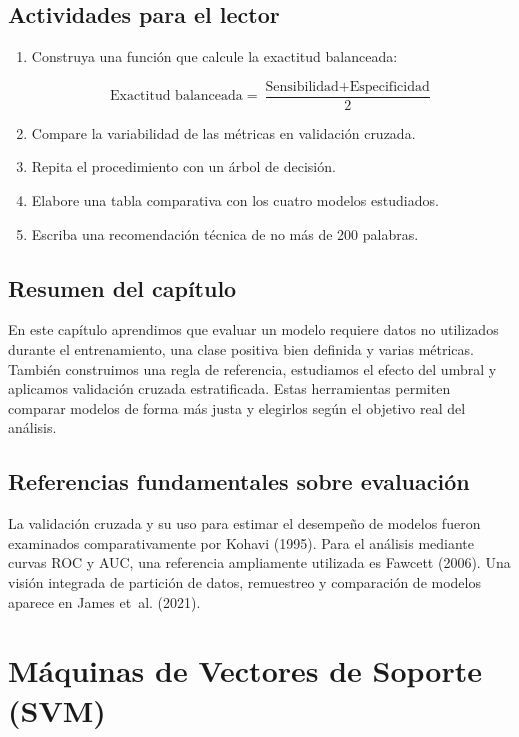 \documentclass[
  spanish,
  10.5pt,
  letterpaper,
  openany,
  headings=big]{scrbook}
\begin{document}
\section{Actividades para el lector}\label{actividades-para-el-lector-1}

\begin{enumerate}
\def\labelenumi{\arabic{enumi}.}
\item
  Construya una función que calcule la exactitud balanceada:

  \[
  \text{Exactitud balanceada}=\frac{\text{Sensibilidad}+\text{Especificidad}}{2}
  \]
\item
  Compare la variabilidad de las métricas en validación cruzada.
\item
  Repita el procedimiento con un árbol de decisión.
\item
  Elabore una tabla comparativa con los cuatro modelos estudiados.
\item
  Escriba una recomendación técnica de no más de 200 palabras.
\end{enumerate}

\section{Resumen del capítulo}\label{resumen-del-capuxedtulo-1}

En este capítulo aprendimos que evaluar un modelo requiere datos no
utilizados durante el entrenamiento, una clase positiva bien definida y
varias métricas. También construimos una regla de referencia, estudiamos
el efecto del umbral y aplicamos validación cruzada estratificada. Estas
herramientas permiten comparar modelos de forma más justa y elegirlos
según el objetivo real del análisis.

\section{Referencias fundamentales sobre
evaluación}\label{referencias-fundamentales-sobre-evaluaciuxf3n}

La validación cruzada y su uso para estimar el desempeño de modelos
fueron examinados comparativamente por Kohavi (1995). Para el análisis
mediante curvas ROC y AUC, una referencia ampliamente utilizada es
Fawcett (2006). Una visión integrada de partición de datos, remuestreo y
comparación de modelos aparece en James et~al. (2021).


\chapter{Máquinas de Vectores de Soporte
(SVM)}\label{muxe1quinas-de-vectores-de-soporte-svm}
\end{document}
